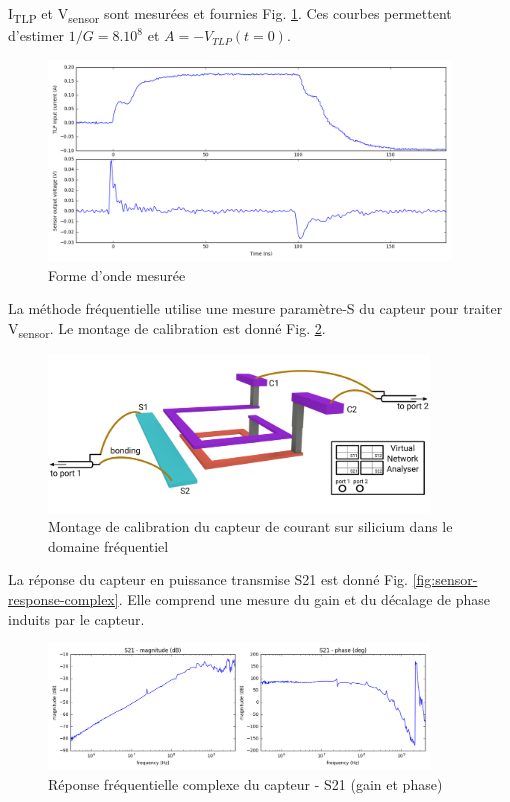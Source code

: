 I\textsubscript{TLP} et V\textsubscript{sensor} sont mesurées et fournies Fig. \ref{fig:measurement-nfs}.
Ces courbes permettent d'estimer $1/G = 8.10^8$ et $A = -V_{TLP}(t = 0)$.

\begin{figure}[!h]
  \centering
  \includegraphics[width=0.95\textwidth]{src/1/figures/measured_waveform.png}
  \caption{Forme d'onde mesurée}
  \label{fig:measurement-nfs}
\end{figure}

La méthode fréquentielle utilise une mesure paramètre-S du capteur pour traiter V\textsubscript{sensor}.
Le montage de calibration est donné Fig. \ref{fig:calibration-sensor-rf}.

\begin{figure}[!h]
  \centering
  \includegraphics[width=0.9\textwidth]{src/1/figures/sensor_measurement_setup_rf.pdf}
  \caption{Montage de calibration du capteur de courant sur silicium dans le domaine fréquentiel}
  \label{fig:calibration-sensor-rf}
\end{figure}

La réponse du capteur en puissance transmise S21 est donné Fig. \ref{fig:sensor-response-complex}.
Elle comprend une mesure du gain et du décalage de phase induits par le capteur.

\begin{figure}[!h]
  \centering
  \includegraphics[width=0.9\textwidth]{src/1/figures/s21_freq_response.png}
  \caption{Réponse fréquentielle complexe du capteur - S21 (gain et phase)}
  \label{fig:s21-response-complex}
\end{figure}


